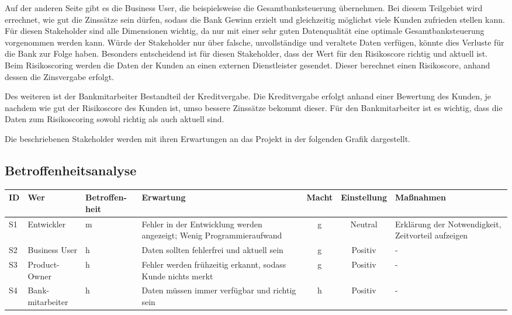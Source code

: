 Auf der anderen Seite gibt es die Business User, die beispielsweise die Gesamtbanksteuerung übernehmen.
Bei diesem Teilgebiet wird errechnet, wie gut die Zinssätze sein dürfen, sodass die Bank Gewinn erzielt und gleichzeitig möglichst viele Kunden zufrieden stellen kann.
Für diesen Stakeholder sind alle Dimensionen wichtig, da nur mit einer sehr guten Datenqualität eine optimale Gesamtbanksteuerung vorgenommen werden kann. 
Würde der Stakeholder nur über falsche, unvollständige und veraltete Daten verfügen, könnte dies Verluste für die Bank zur Folge haben.
Besonders entscheidend ist für diesen Stakeholder, dass der Wert für den Risikoscore richtig und aktuell ist.
Beim Risikoscoring werden die Daten der Kunden an einen externen Dienstleister gesendet.
Dieser berechnet einen Risikoscore, anhand dessen die Zinsvergabe erfolgt.

Des weiteren ist der Bankmitarbeiter Bestandteil der Kreditvergabe. 
Die Kreditvergabe erfolgt anhand einer Bewertung des Kunden, je nachdem wie gut der Risikoscore des Kunden ist, umso bessere Zinssätze bekommt dieser.
Für den Bankmitarbeiter ist es wichtig, dass die Daten zum Risikoscoring sowohl richtig als auch aktuell sind.

Die beschriebenen Stakeholder werden mit ihren Erwartungen an das Projekt in der folgenden Grafik dargestellt.
\subsection{Betroffenheitsanalyse}
\begin{tabular}[h]{l|p{2cm}|>{\centering}p{1.5cm}|p{2.5cm}|c|c|p{3cm}}
ID & Wer        & Betroffen-heit & Erwartung & Macht & Einstellung & Maßnahmen  \\ \hline
S1 & Entwickler & m             & Fehler in der Entwicklung werden angezeigt; Wenig Programmieraufwand & g & Neutral & Erklärung der Notwendigkeit, Zeitvorteil aufzeigen  \\ \hline
S2 & Business User & h          & Daten sollten fehlerfrei und aktuell sein & g & Positiv & - \\ \hline
S3 & Product-Owner & h          & Fehler werden frühzeitig erkannt, sodass Kunde nichts merkt & g & Positiv & - \\ \hline
S4 & Bank-mitarbeiter & h          & Daten müssen immer verfügbar und richtig sein & h & Positiv & - \\
\end{tabular}


